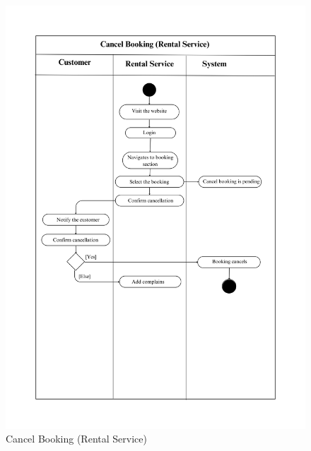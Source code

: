 \begin{figure}[h!]
    \centering
    \includegraphics[width=1\textwidth]{Images/Activity Diagrams/25 Cancel Booking (Rental Service).png}
    \caption{Cancel Booking (Rental Service)}
    \label{fig:activity-cancel-rental}
\end{figure}

